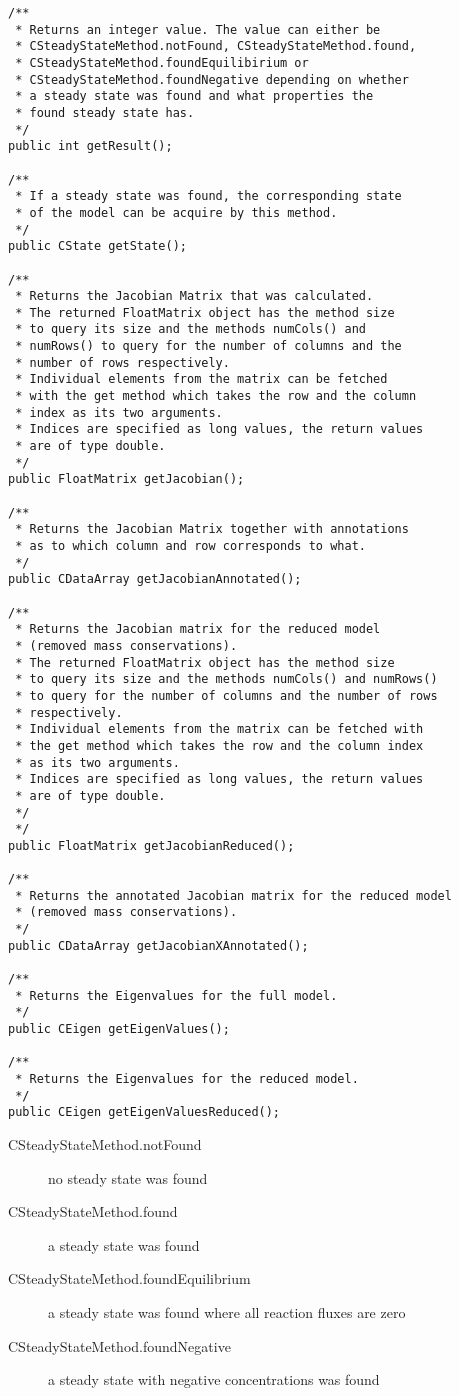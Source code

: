 \documentclass[a4,10pt]{article}
\begin{document}
\begin{lstlisting}
/**
 * Returns an integer value. The value can either be
 * CSteadyStateMethod.notFound, CSteadyStateMethod.found,
 * CSteadyStateMethod.foundEquilibirium or
 * CSteadyStateMethod.foundNegative depending on whether 
 * a steady state was found and what properties the 
 * found steady state has.
 */
public int getResult();

/**
 * If a steady state was found, the corresponding state
 * of the model can be acquire by this method.
 */
public CState getState();

/**
 * Returns the Jacobian Matrix that was calculated.
 * The returned FloatMatrix object has the method size
 * to query its size and the methods numCols() and 
 * numRows() to query for the number of columns and the
 * number of rows respectively.
 * Individual elements from the matrix can be fetched
 * with the get method which takes the row and the column
 * index as its two arguments.
 * Indices are specified as long values, the return values
 * are of type double.
 */
public FloatMatrix getJacobian();

/**
 * Returns the Jacobian Matrix together with annotations
 * as to which column and row corresponds to what.
 */
public CDataArray getJacobianAnnotated();

/**
 * Returns the Jacobian matrix for the reduced model 
 * (removed mass conservations).
 * The returned FloatMatrix object has the method size
 * to query its size and the methods numCols() and numRows()
 * to query for the number of columns and the number of rows
 * respectively.
 * Individual elements from the matrix can be fetched with 
 * the get method which takes the row and the column index
 * as its two arguments.
 * Indices are specified as long values, the return values
 * are of type double.
 */
 */
public FloatMatrix getJacobianReduced();

/**
 * Returns the annotated Jacobian matrix for the reduced model 
 * (removed mass conservations).
 */
public CDataArray getJacobianXAnnotated();

/**
 * Returns the Eigenvalues for the full model.
 */
public CEigen getEigenValues();

/**
 * Returns the Eigenvalues for the reduced model.
 */
public CEigen getEigenValuesReduced();
\end{lstlisting}

\begin{description}
\item[CSteadyStateMethod.notFound]{no steady state was found}
\item[CSteadyStateMethod.found]{a steady state was found}
\item[CSteadyStateMethod.foundEquilibrium]{a steady state was found where all reaction fluxes are zero}
\item[CSteadyStateMethod.foundNegative]{a steady state with negative concentrations was found}
\end{description}
\end{document}
